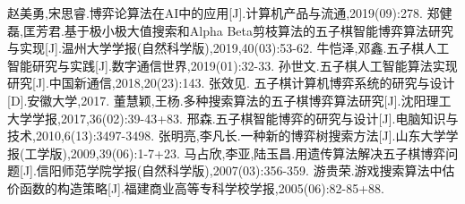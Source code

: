 \documentclass[a4paper]{article}
\begin{document}
\begin{multicols}{2}
\begin{thebibliography}{30}
赵美勇,宋思睿.博弈论算法在AI中的应用[J].计算机产品与流通,2019(09):278.
郑健磊,匡芳君.基于极小极大值搜索和Alpha Beta剪枝算法的五子棋智能博弈算法研究与实现[J].温州大学学报(自然科学版),2019,40(03):53-62.
牛恺泽,邓鑫.五子棋人工智能研究与实践[J].数字通信世界,2019(01):32-33.
孙世文.五子棋人工智能算法实现研究[J].中国新通信,2018,20(23):143.
张效见. 五子棋计算机博弈系统的研究与设计[D].安徽大学,2017.
董慧颖,王杨.多种搜索算法的五子棋博弈算法研究[J].沈阳理工大学学报,2017,36(02):39-43+83.
邢森.五子棋智能博弈的研究与设计[J].电脑知识与技术,2010,6(13):3497-3498.
张明亮,李凡长.一种新的博弈树搜索方法[J].山东大学学报(工学版),2009,39(06):1-7+23.
马占欣,李亚,陆玉昌.用遗传算法解决五子棋博弈问题[J].信阳师范学院学报(自然科学版),2007(03):356-359.
游贵荣.游戏搜索算法中估价函数的构造策略[J].福建商业高等专科学校学报,2005(06):82-85+88.
  \end{thebibliography}
  \newpage
\end{multicols}
\end{document}
